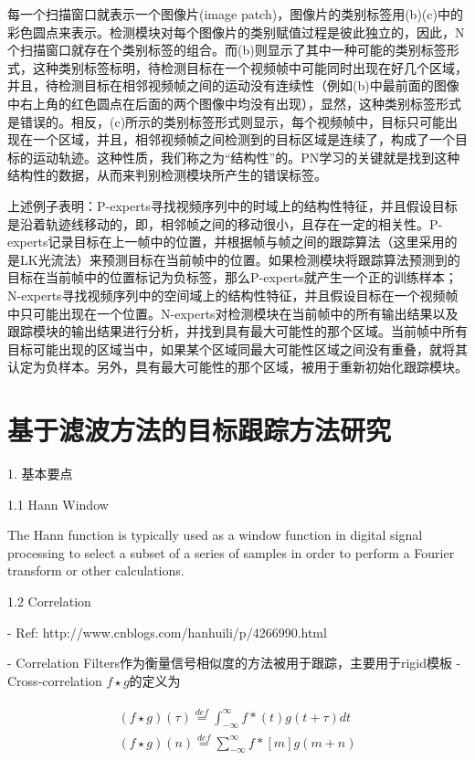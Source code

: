 每一个扫描窗口就表示一个图像片(image patch)，图像片的类别标签用(b)(c)中的彩色圆点来表示。检测模块对每个图像片的类别赋值过程是彼此独立的，因此，N个扫描窗口就存在个类别标签的组合。而(b)则显示了其中一种可能的类别标签形式，这种类别标签标明，待检测目标在一个视频帧中可能同时出现在好几个区域，并且，待检测目标在相邻视频帧之间的运动没有连续性（例如(b)中最前面的图像中右上角的红色圆点在后面的两个图像中均没有出现），显然，这种类别标签形式是错误的。相反，(c)所示的类别标签形式则显示，每个视频帧中，目标只可能出现在一个区域，并且，相邻视频帧之间检测到的目标区域是连续了，构成了一个目标的运动轨迹。这种性质，我们称之为“结构性”的。PN学习的关键就是找到这种结构性的数据，从而来判别检测模块所产生的错误标签。

上述例子表明：P-experts寻找视频序列中的时域上的结构性特征，并且假设目标是沿着轨迹线移动的，即，相邻帧之间的移动很小，且存在一定的相关性。P-experts记录目标在上一帧中的位置，并根据帧与帧之间的跟踪算法（这里采用的是LK光流法）来预测目标在当前帧中的位置。如果检测模块将跟踪算法预测到的目标在当前帧中的位置标记为负标签，那么P-experts就产生一个正的训练样本；N-experts寻找视频序列中的空间域上的结构性特征，并且假设目标在一个视频帧中只可能出现在一个位置。N-experts对检测模块在当前帧中的所有输出结果以及跟踪模块的输出结果进行分析，并找到具有最大可能性的那个区域。当前帧中所有目标可能出现的区域当中，如果某个区域同最大可能性区域之间没有重叠，就将其认定为负样本。另外，具有最大可能性的那个区域，被用于重新初始化跟踪模块。

\section{基于滤波方法的目标跟踪方法研究}
 
1. 基本要点

1.1 Hann Window

The Hann function is typically used as a window function in digital signal processing to select a subset of a series of samples in order to perform a Fourier transform or other calculations.

1.2 Correlation

- Ref: http://www.cnblogs.com/hanhuili/p/4266990.html


- Correlation Filters作为衡量信号相似度的方法被用于跟踪，主要用于rigid模板
- Cross-correlation $f \star g$的定义为

\begin{align}
\begin{array}{l} (f \star g)(\tau )\mathop  = \limits^{def} \int_{ - \infty }^\infty  {f*(t)g(t + \tau )dt} \\ (f \star g)(n)\mathop  = \limits^{def} \sum\limits_{ - \infty }^\infty  {f*[m]g(m + n)}  \end{array}
\end{align}

